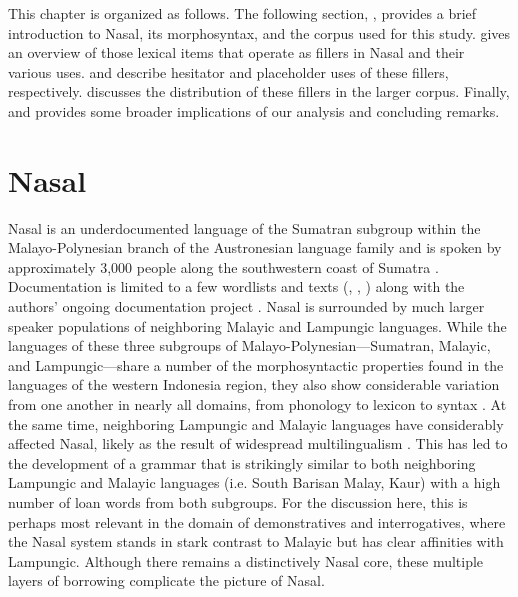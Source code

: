 \documentclass[output=paper,colorlinks,citecolor=brown
\ChapterDOI{10.5281/zenodo.15697585}
]{langscibook}
\begin{document}
This chapter is organized as follows. The following section, , provides a brief introduction to Nasal, its morphosyntax, and the corpus used for this study.  gives an overview of those lexical items that operate as fillers in Nasal and their various uses.  and  describe hesitator and placeholder uses of these fillers, respectively.  discusses the distribution of these fillers in the larger corpus. Finally,  and  provides some broader implications of our analysis and concluding remarks.

\section{Nasal}\label{sec:Nasal}
Nasal is an underdocumented language of the Sumatran subgroup within the Malayo-Polynesian branch of the Austronesian language family and is spoken by approximately 3,000 people along the southwestern coast of Sumatra \parencite{billings2024sumatran}. Documentation is limited to a few wordlists and texts (\cite{stokhof_1987}, \cite{southsumatralanguagesmap_1987}, \cite{anderbeckaprilani_2013}) along with the authors' ongoing documentation project \parencite{mcdonnell2017elar,mcdonnell2019documentation}. Nasal is surrounded by much larger speaker populations of neighboring Malayic and Lampungic languages. While the languages of these three subgroups of Malayo-Polynesian—Sumatran, Malayic, and Lampungic—share a number of the morphosyntactic properties found in the languages of the western Indonesia region, they also show considerable variation from one another in nearly all domains, from phonology to lexicon to syntax \parencite[see][]{mcdonnell2024malayic,mcdonnell2024nonmalayic}. At the same time, neighboring Lampungic and Malayic languages have considerably affected Nasal, likely as the result of widespread multilingualism \parencite{mcdonnelltoappeardocumenting}. This has led to the development of a grammar that is strikingly similar to both neighboring Lampungic and Malayic languages (i.e. South Barisan Malay, Kaur) with a high number of loan words from both subgroups. For the discussion here, this is perhaps most relevant in the domain of demonstratives and interrogatives, where the Nasal system stands in stark contrast to Malayic but has clear affinities with Lampungic. Although there remains a distinctively Nasal core, these multiple layers of borrowing complicate the picture of Nasal. 
\end{document}
